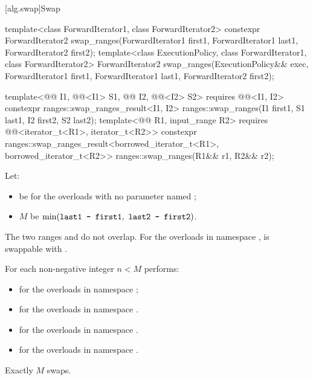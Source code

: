 [alg.swap]{Swap}

%
\begin{itemdecl}
template<class ForwardIterator1, class ForwardIterator2>
  constexpr ForwardIterator2
    swap_ranges(ForwardIterator1 first1, ForwardIterator1 last1,
                ForwardIterator2 first2);
template<class ExecutionPolicy, class ForwardIterator1, class ForwardIterator2>
  ForwardIterator2
    swap_ranges(ExecutionPolicy&& exec,
                ForwardIterator1 first1, ForwardIterator1 last1,
                ForwardIterator2 first2);

template<@@ I1, @@<I1> S1, @@ I2, @@<I2> S2>
  requires @@<I1, I2>
  constexpr ranges::swap_ranges_result<I1, I2>
    ranges::swap_ranges(I1 first1, S1 last1, I2 first2, S2 last2);
template<@@ R1, input_range R2>
  requires @@<iterator_t<R1>, iterator_t<R2>>
  constexpr ranges::swap_ranges_result<borrowed_iterator_t<R1>, borrowed_iterator_t<R2>>
    ranges::swap_ranges(R1&& r1, R2&& r2);
\end{itemdecl}

\begin{itemdescr}
\pnum
Let:
\begin{itemize}
\item
   be 
  for the overloads with no parameter named ;
\item $M$ be $\min(\tcode{last1 - first1}, \ \tcode{last2 - first2})$.
\end{itemize}

\pnum
\expects
The two ranges  and 
do not overlap.
For the overloads in namespace ,
 is swappable with
.

\pnum
\effects
For each non-negative integer $n < M$ performs:
\begin{itemize}
\item
  for the overloads in namespace ;
\item
  for the overloads in namespace .
\end{itemize}

\pnum
\returns
\begin{itemize}
\item
  for the overloads in namespace .
\item
  for the overloads in namespace .
\end{itemize}

\pnum
\complexity
Exactly $M$ swaps.
\end{itemdescr}

